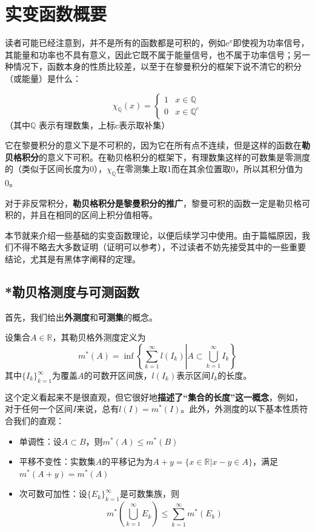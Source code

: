 \section{实变函数概要}\label{sec:Real_Analysis}

读者可能已经注意到，并不是所有的函数都是可积的，例如$\mathrm{e}^x$即使视为功率信号，其能量和功率也不具有意义，因此它既不属于能量信号，也不属于功率信号；另一种情况下，函数本身的性质比较差，以至于在黎曼积分的框架下说不清它的积分（或能量）是什么：
\begin{example}[狄利克雷函数]
    \[\chi_{\mathbb{Q}}(x)=
    \begin{cases}
        1 & x \in \mathbb{Q}    \\
        0 & x \in \mathbb{Q} ^c
    \end{cases}\]
（其中$\mathbb{Q}$ 表示有理数集，上标c表示取补集）
\end{example}
它在黎曼积分的意义下是不可积的，因为它在所有点不连续，但是这样的函数在\textbf{勒贝格积分}的意义下可积。在勒贝格积分的框架下，有理数集这样的可数集是零测度的（类似于区间长度为0），$\chi_{\mathbb{Q}}$在零测集上取1而在其余位置取0，所以其积分值为0。

对于非反常积分，\textbf{勒贝格积分是黎曼积分的推广}，黎曼可积的函数一定是勒贝格可积的，并且在相同的区间上积分值相等。

本节就来介绍一些基础的实变函数理论，以便后续学习中使用。由于篇幅原因，我们不得不略去大多数证明（证明可以参考\cite{real_analysis}），不过读者不妨先接受其中的一些重要结论，尤其是有黑体字阐释的定理。

\subsection{*勒贝格测度与可测函数}\label{sub:lebesgue}

首先，我们给出\textbf{外测度}和\textbf{可测集}的概念。
\begin{definition}[勒贝格外测度]
    设集合$A\in\mathbb{R}$，其勒贝格外测度定义为
    \[m^*(A)=\inf\left\{\sum_{k=1}^{\infty}l(I_k)\left|A\subset\bigcup_{k=1}^{\infty}I_k\right.\right\}\]
    其中$\{I_k\}_{k=1}^{\infty}$为覆盖$A$的可数开区间族，$l(I_k)$表示区间$I_k$的长度。
\end{definition}
这个定义看起来不是很直观，但它很好地\textbf{描述了“集合的长度”这一概念}，例如，对于任何一个区间$I$来说，总有$l(I)=m^*(I)$。此外，外测度的以下基本性质符合我们的直观：
\begin{proposition}[外测度的性质]
    \quad
    \begin{itemize}
        \item 单调性：设$A\subset B$，则$m^*(A)\leq m^*(B)$
        \item 平移不变性：实数集$A$的平移记为为$A+y=\{x\in \mathbb{R}|x-y\in A\}$，满足$m^*(A+y)=m^*(A)$
        \item 次可数可加性：设$\{E_k\}_{k=1}^{\infty}$是可数集族，则
        $$m^*\left(\bigcup_{k=1}^{\infty}E_k\right)\leq\sum_{k=1}^{\infty}m^*(E_k)$$
    \end{itemize}
\end{proposition}

